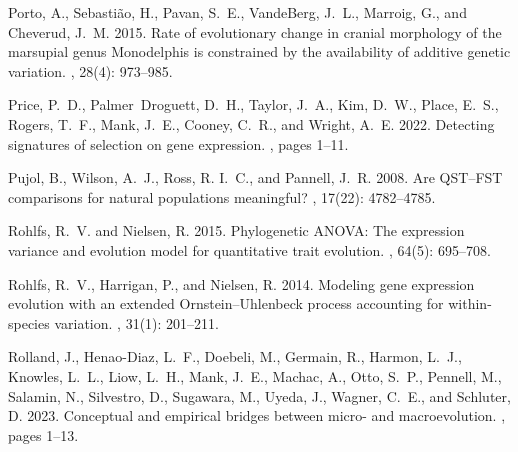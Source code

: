 \documentclass{article}
\begin{document}
\begin{thebibliography}{}
    Porto, A., Sebasti{\~a}o, H., Pavan, S.~E., VandeBerg, J.~L., Marroig, G., and
    Cheverud, J.~M. 2015.
    \newblock Rate of evolutionary change in cranial morphology of the marsupial
    genus {{Monodelphis}} is constrained by the availability of additive genetic
    variation.
    , {28}(4): 973--985.

    Price, P.~D., Palmer~Droguett, D.~H., Taylor, J.~A., Kim, D.~W., Place, E.~S.,
    Rogers, T.~F., Mank, J.~E., Cooney, C.~R., and Wright, A.~E. 2022.
    \newblock Detecting signatures of selection on gene expression.
    , pages 1--11.

    Pujol, B., Wilson, A.~J., Ross, R. I.~C., and Pannell, J.~R. 2008.
    \newblock Are {{QST}}--{{FST}} comparisons for natural populations meaningful?
    , {17}(22): 4782--4785.

    Rohlfs, R.~V. and Nielsen, R. 2015.
    \newblock Phylogenetic {{ANOVA}}: {{The}} expression variance and evolution
    model for quantitative trait evolution.
    , {64}(5): 695--708.

    Rohlfs, R.~V., Harrigan, P., and Nielsen, R. 2014.
    \newblock Modeling gene expression evolution with an extended
        {{Ornstein}}--{{Uhlenbeck}} process accounting for within-species variation.
    , {31}(1): 201--211.

    Rolland, J., {Henao-Diaz}, L.~F., Doebeli, M., Germain, R., Harmon, L.~J.,
    Knowles, L.~L., Liow, L.~H., Mank, J.~E., Machac, A., Otto, S.~P., Pennell,
    M., Salamin, N., Silvestro, D., Sugawara, M., Uyeda, J., Wagner, C.~E., and
    Schluter, D. 2023.
    \newblock Conceptual and empirical bridges between micro- and macroevolution.
    , pages 1--13.


\end{thebibliography}
\end{document}
